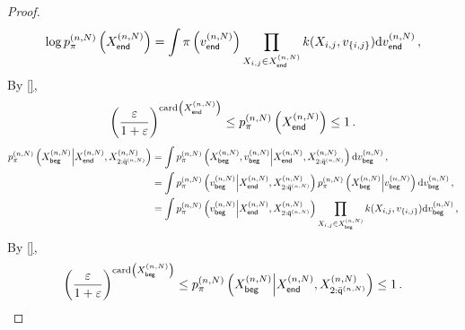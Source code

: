 \begin{proof}
\[
\log p_{\pi}^{(n,N)}\left(X_{\mathsf{end}}^{(n,N)}\right) = \int \pi\left(v_{\mathsf{end}}^{(n,N)}\right) \prod_{X_{i,j}\in X_{\mathsf{end}}^{(n,N)}}k(X_{i,j},v_{\{i,j\}})\mathrm{d} v_{\mathsf{end}}^{(n,N)}\,,
\]
By \eqref{},
\[
 \left(\frac{\varepsilon}{1+\varepsilon}\right)^{\mathrm{card}\left(X_{\mathsf{end}}^{(n,N)}\right)}\le p_{\pi}^{(n,N)}\left(X_{\mathsf{end}}^{(n,N)}\right)  \le 1\,.
\]
\begin{align*}
p_{\pi}^{(n,N)}\left(X_{\mathsf{beg}}^{(n,N)}\middle|X_{\mathsf{end}}^{(n,N)},X_{2:\bar{\mathsf{q}}^{(n,N)}}^{(n,N)}\right) &= \int p_{\pi}^{(n,N)}\left(X_{\mathsf{beg}}^{(n,N)},v_{\mathsf{beg}}^{(n,N)}\middle|X_{\mathsf{end}}^{(n,N)},X_{2:\bar{\mathsf{q}}^{(n,N)}}^{(n,N)}\right)\mathrm{d} v_{\mathsf{beg}}^{(n,N)}\,,\\
&=\int p_{\pi}^{(n,N)}\left(v_{\mathsf{beg}}^{(n,N)}\middle|X_{\mathsf{end}}^{(n,N)},X_{2:\bar{\mathsf{q}}^{(n,N)}}^{(n,N)}\right) p_{\pi}^{(n,N)}\left(X_{\mathsf{beg}}^{(n,N)}\middle|v_{\mathsf{beg}}^{(n,N)}\right)\mathrm{d} v_{\mathsf{beg}}^{(n,N)}\,,\\
&=\int p_{\pi}^{(n,N)}\left(v_{\mathsf{beg}}^{(n,N)}\middle|X_{\mathsf{end}}^{(n,N)},X_{2:\bar{\mathsf{q}}^{(n,N)}}^{(n,N)}\right) \prod_{X_{i,j}\in X_{\mathsf{beg}}^{(n,N)}}k(X_{i,j},v_{\{i,j\}})\mathrm{d} v_{\mathsf{beg}}^{(n,N)}\,,\\
\end{align*}
By \eqref{},
\[
 \left(\frac{\varepsilon}{1+\varepsilon}\right)^{\mathrm{card}\left(X_{\mathsf{beg}}^{(n,N)}\right)}\le p_{\pi}^{(n,N)}\left(X_{\mathsf{beg}}^{(n,N)}\middle|X_{\mathsf{end}}^{(n,N)},X_{2:\bar{\mathsf{q}}^{(n,N)}}^{(n,N)}\right) \le 1\,.
\]
\end{proof}


